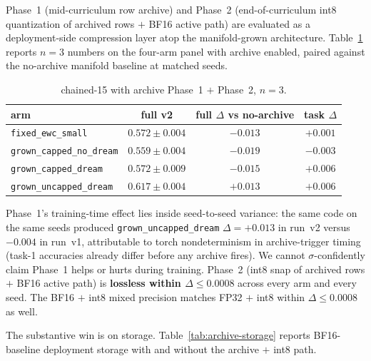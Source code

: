 \documentclass[11pt]{article}
\newcommand{\arm}[1]{\texttt{#1}}
\begin{document}
Phase~1 (mid-curriculum row archive) and Phase~2 (end-of-curriculum int8
quantization of archived rows $+$ BF16 active path) are evaluated as a
deployment-side compression layer atop the manifold-grown architecture.
Table~\ref{tab:archive-acc} reports $n = 3$ numbers on the four-arm panel
with archive enabled, paired against the no-archive manifold baseline at
matched seeds.

\begin{table}[h]
  \centering
  \caption{chained-15 with archive Phase~1 $+$ Phase~2, $n = 3$.}
  \label{tab:archive-acc}
  \begin{tabular}{lccc}
    \toprule
    arm                              & full v2           & full $\Delta$ vs no-archive & task $\Delta$ \\
    \midrule
    \arm{fixed\_ewc\_small}          & $0.572 \pm 0.004$ & $-0.013$                    & $+0.001$      \\
    \arm{grown\_capped\_no\_dream}   & $0.559 \pm 0.004$ & $-0.019$                    & $-0.003$      \\
    \arm{grown\_capped\_dream}       & $0.572 \pm 0.009$ & $-0.015$                    & $+0.006$      \\
    \arm{grown\_uncapped\_dream}     & $0.617 \pm 0.004$ & $+0.013$                    & $+0.006$      \\
    \bottomrule
  \end{tabular}
\end{table}

Phase~1's training-time effect lies inside seed-to-seed variance: the same
code on the same seeds produced \arm{grown\_uncapped\_dream}
$\Delta = +0.013$ in run~v2 versus $-0.004$ in run~v1, attributable to
torch nondeterminism in archive-trigger timing (task-1 accuracies already
differ before any archive fires). We cannot $\sigma$-confidently claim
Phase~1 helps or hurts during training. Phase~2 (int8 snap of archived
rows $+$ BF16 active path) is \textbf{lossless within $\Delta \leq 0.0008$}
across every arm and every seed. The BF16 $+$ int8 mixed precision
matches FP32 $+$ int8 within $\Delta \leq 0.0008$ as well.

The substantive win is on storage. Table~\ref{tab:archive-storage}
reports BF16-baseline deployment storage with and without the archive
$+$ int8 path.
\end{document}
